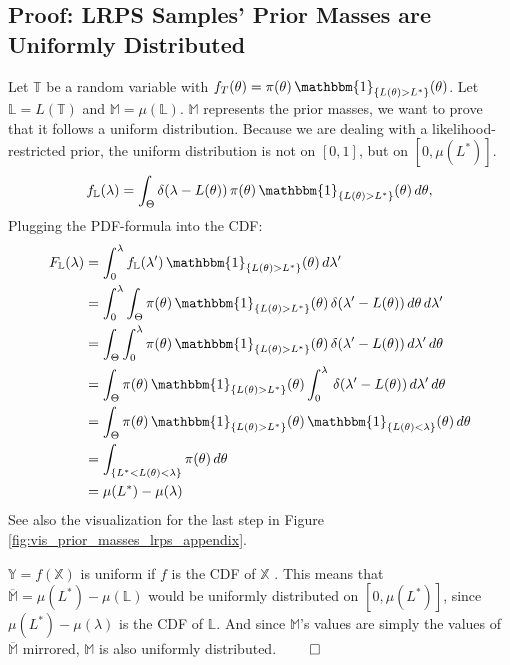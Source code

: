 \documentclass[12pt, a4paper]{report}
\begin{document}
\subsection*{Proof: LRPS Samples' Prior Masses are Uniformly Distributed}
Let $\mathbb{T}$ be a random variable with $f_T(\theta) = \pi(\theta) \, \mathbbm{1}_{\{L(\theta)>L^*\}}(\theta)$.
Let $\mathbb{L} = L(\mathbb{T})$ and $\mathbb{M} = \mu(\mathbb{L})$.
$\mathbb{M}$ represents the prior masses, we want to prove that it follows a uniform distribution.
Because we are dealing with a likelihood-restricted prior, the uniform distribution is not on $[0,1]$, but on $[0, \mu(L^*)]$.
\begin{equation*}
    f_\mathbb{L}(\lambda) = \int_\Theta \delta(\lambda - L(\theta)) \, \pi(\theta) \, \mathbbm{1}_{\{L(\theta)>L^*\}}(\theta) \, d\theta,
\end{equation*}
Plugging the PDF-formula into the CDF:
\begin{align}
    F_\mathbb{L}(\lambda) &= \int_0^\lambda f_\mathbb{L}(\lambda') \, \mathbbm{1}_{\{L(\theta)>L^*\}}(\theta) \, d\lambda' \nonumber\\
    &= \int_0^\lambda \int_\Theta \pi(\theta) \, \mathbbm{1}_{\{L(\theta)>L^*\}}(\theta) \, \delta(\lambda' - L(\theta)) \, d\theta \, d\lambda' \nonumber\\
    &= \int_\Theta \int_0^\lambda \pi(\theta) \, \mathbbm{1}_{\{L(\theta)>L^*\}}(\theta) \, \delta(\lambda' - L(\theta)) \, d\lambda'\, d\theta \nonumber\\
    &= \int_\Theta \pi(\theta) \, \mathbbm{1}_{\{L(\theta)>L^*\}}(\theta) \int_0^\lambda \, \delta(\lambda' - L(\theta)) \, d\lambda' \, d\theta \nonumber\\
    &= \int_\Theta \pi(\theta) \, \mathbbm{1}_{\{L(\theta)>L^*\}}(\theta) \, \mathbbm{1}_{\{L(\theta) < \lambda\}}(\theta) \, d\theta \nonumber\\
    &= \int_{\{L^* < L(\theta) < \lambda\}} \pi(\theta)\, d\theta \label{eq:prior_mass_integral_appendix}\\
    &= \mu(L^*) - \mu(\lambda) \nonumber
\end{align}
See also the visualization for the last step in Figure \ref{fig:vis_prior_masses_lrps_appendix}.

$\mathbb{Y} = f(\mathbb{X})$ is uniform if $f$ is the CDF of $\mathbb{X}$ \cite[54]{casellaberger}.
This means that $\overline{\mathbb{M}} = \mu(L^*) - \mu(\mathbb{L})$ would be uniformly distributed on $[0,\mu(L^*)]$, since $\mu(L^*) - \mu(\lambda)$ is the CDF of $\mathbb{L}$.
And since $\mathbb{M}$'s values are simply the values of $\overline{\mathbb{M}}$ mirrored, $\mathbb{M}$ is also uniformly distributed.
\hfill $\qed$
\end{document}
